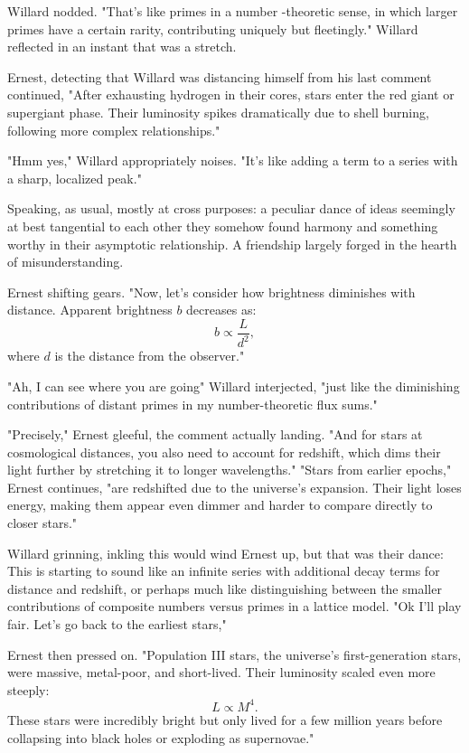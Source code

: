 Willard nodded. "That’s like primes in a number
-theoretic sense, in which larger primes have a certain rarity, contributing uniquely but fleetingly." Willard reflected in an instant that was a stretch.

Ernest, detecting that Willard was distancing himself from his last comment continued, "After exhausting hydrogen in their cores, stars enter the red giant or supergiant phase. Their luminosity spikes dramatically due to shell burning, following more complex relationships."

"Hmm yes," Willard appropriately noises. "It’s like adding a term to a series with a sharp, localized peak."

Speaking, as usual, mostly at cross purposes: a peculiar dance of ideas seemingly at best tangential to each other they somehow found harmony and something worthy in their asymptotic relationship. A friendship largely forged in the hearth of misunderstanding.

Ernest shifting gears. "Now, let’s consider how brightness diminishes with distance. Apparent brightness \(b\) decreases as:
\[
b \propto \frac{L}{d^2},
\]
where \(d\) is the distance from the observer."

"Ah, I can see where you are going" Willard interjected, "just like the diminishing contributions of distant primes in my number-theoretic flux sums."

"Precisely," Ernest gleeful, the comment actually landing. "And for stars at cosmological distances, you also need to account for redshift, which dims their light further by stretching it to longer wavelengths." "Stars from earlier epochs," Ernest continues, "are redshifted due to the universe's expansion. Their light loses energy, making them appear even dimmer and harder to compare directly to closer stars."

Willard grinning, inkling this would wind Ernest up, but that was their dance: This is starting to sound like an infinite series with additional decay terms for distance and redshift, or perhaps much like distinguishing between the smaller contributions of composite numbers versus primes in a lattice model. "Ok I'll play fair. Let’s go back to the earliest stars," 

Ernest then pressed on. "Population III stars, the universe’s first-generation stars, were massive, metal-poor, and short-lived. Their luminosity scaled even more steeply:
\[
L \propto M^4.
\]
These stars were incredibly bright but only lived for a few million years before collapsing into black holes or exploding as supernovae."

